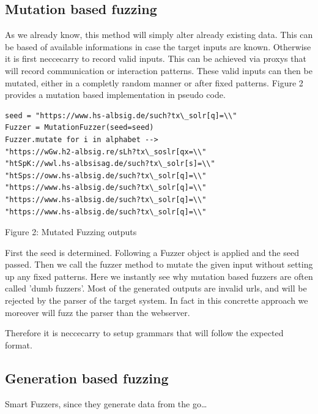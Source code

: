 \documentclass[journal=tosc,final]{iacrtrans}
\begin{document}
\subsection{Mutation based fuzzing}
As we already know, this method will simply alter already existing data. This can be based of available informations in case the target inputs are known. Otherwise it is first neccecarry to record valid inputs. This can be achieved via proxys that will record communication or interaction patterns. These valid inputs can then be mutated, either in a completly random manner or after fixed patterns. Figure 2 provides a mutation based implementation in pseudo code. 
\begin{center}
\begin{shaded}
\begin{verbatim}
seed = "https://www.hs-albsig.de/such?tx\_solr[q]=\\"
Fuzzer = MutationFuzzer(seed=seed)
Fuzzer.mutate for i in alphabet -->
"https://wGw.h2-albsig.re/sLh?tx\_soslr[qx=\\"
"htSpK://wwl.hs-albsisag.de/such?tx\_solr[s]=\\"
"htSps://oww.hs-albsig.de/such?tx\_solr[q]=\\"
"https://www.hs-albsig.de/such?tx\_solr[q]=\\"
"https://www.hs-albsig.de/such?tx\_solr[q]=\\"
"https://www.hs-albsig.de/such?tx\_solr[q]=\\"
\end{verbatim}
\vspace{2mm} Figure 2: Mutated Fuzzing outputs
\end{shaded}
\end{center}
First the seed is determined. Following a Fuzzer object is applied and the seed passed. Then we call the fuzzer method to mutate the given input without setting up any fixed patterns. Here we instantly see why mutation based fuzzers are often called 'dumb fuzzers'. 
Most of the generated outputs are invalid urls, and will be rejected by the parser of the target system. In fact in this concrette approach we moreover will fuzz the parser than the webserver.

Therefore it is neccecarry to setup grammars that will follow the expected format.
\newpage
\subsection{Generation based fuzzing}
Smart Fuzzers, since they generate data from the go\dots
\newpage
\end{document}
